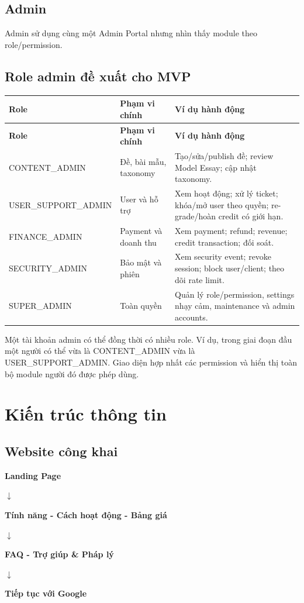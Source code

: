 \documentclass[11pt,a4paper]{article}
\newcommand{\flowarrow}{\par\centering\sffamily\color{BandBlue}\Large$\downarrow$\par}
\newcommand{\flowstep}[1]{\par\centering\sffamily\bfseries #1\par}
\begin{document}
\subsection{Admin}
Admin sử dụng cùng một Admin Portal nhưng nhìn thấy module theo role/permission.

\subsection{Role admin đề xuất cho MVP}
\small
\begin{longtable}{|P{0.23\textwidth}|P{0.31\textwidth}|P{0.36\textwidth}|}
\hline
\textbf{Role} & \textbf{Phạm vi chính} & \textbf{Ví dụ hành động} \\ \hline
\endfirsthead
\hline
\textbf{Role} & \textbf{Phạm vi chính} & \textbf{Ví dụ hành động} \\ \hline
\endhead
CONTENT\_ADMIN & Đề, bài mẫu, taxonomy & Tạo/sửa/publish đề; review Model Essay; cập nhật taxonomy. \\ \hline
USER\_SUPPORT\_ADMIN & User và hỗ trợ & Xem hoạt động; xử lý ticket; khóa/mở user theo quyền; re-grade/hoàn credit có giới hạn. \\ \hline
FINANCE\_ADMIN & Payment và doanh thu & Xem payment; refund; revenue; credit transaction; đối soát. \\ \hline
SECURITY\_ADMIN & Bảo mật và phiên & Xem security event; revoke session; block user/client; theo dõi rate limit. \\ \hline
SUPER\_ADMIN & Toàn quyền & Quản lý role/permission, settings nhạy cảm, maintenance và admin accounts. \\ \hline
\end{longtable}
\normalsize

\begin{importantbox}
Một tài khoản admin có thể đồng thời có nhiều role. Ví dụ, trong giai đoạn đầu một người có thể vừa là CONTENT\_ADMIN vừa là USER\_SUPPORT\_ADMIN. Giao diện hợp nhất các permission và hiển thị toàn bộ module người đó được phép dùng.
\end{importantbox}

\section{Kiến trúc thông tin}

\subsection{Website công khai}
\begin{flowbox}
\flowstep{Landing Page}
\flowarrow
\flowstep{Tính năng - Cách hoạt động - Bảng giá}
\flowarrow
\flowstep{FAQ - Trợ giúp \& Pháp lý}
\flowarrow
\flowstep{Tiếp tục với Google}
\end{flowbox}
\end{document}
